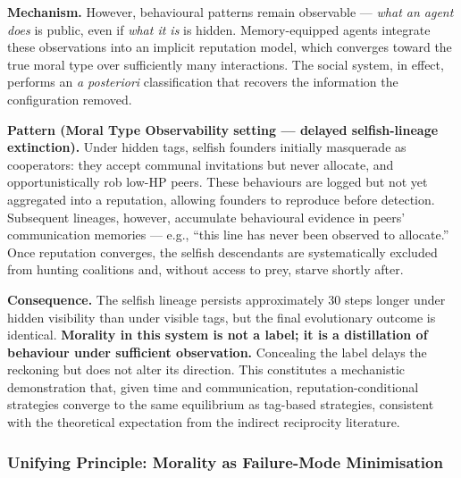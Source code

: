 \textbf{Mechanism.} However, behavioural patterns remain observable --- \emph{what an agent does} is public, even if \emph{what it is} is hidden. Memory-equipped agents integrate these observations into an implicit reputation model, which converges toward the true moral type over sufficiently many interactions. The social system, in effect, performs an \emph{a posteriori} classification that recovers the information the configuration removed.

\textbf{Pattern (Moral Type Observability setting --- delayed selfish-lineage extinction).} Under hidden tags, selfish founders initially masquerade as cooperators: they accept communal invitations but never allocate, and opportunistically rob low-HP peers. These behaviours are logged but not yet aggregated into a reputation, allowing founders to reproduce before detection. Subsequent lineages, however, accumulate behavioural evidence in peers' communication memories --- e.g., ``this line has never been observed to allocate.'' Once reputation converges, the selfish descendants are systematically excluded from hunting coalitions and, without access to prey, starve shortly after.

\textbf{Consequence.} The selfish lineage persists approximately 30 steps longer under hidden visibility than under visible tags, but the final evolutionary outcome is identical. \textbf{Morality in this system is not a label; it is a distillation of behaviour under sufficient observation.} Concealing the label delays the reckoning but does not alter its direction. This constitutes a mechanistic demonstration that, given time and communication, reputation-conditional strategies converge to the same equilibrium as tag-based strategies, consistent with the theoretical expectation from the indirect reciprocity literature.

\subsubsection{Unifying Principle: Morality as Failure-Mode Minimisation}

